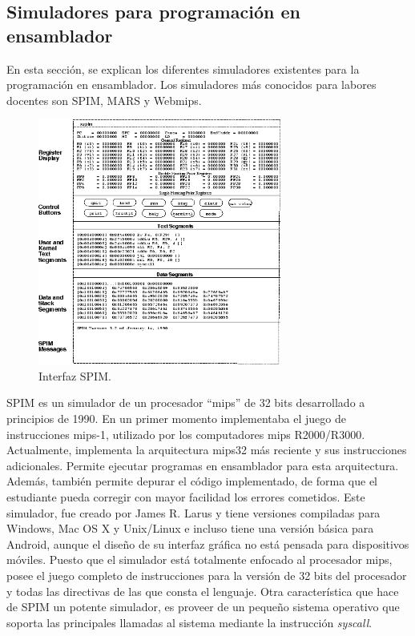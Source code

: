 \subsection{Simuladores para programación en \gls{ensamblador}}
\label{sec:simuladores_ensamblador}
En esta sección, se explican los diferentes simuladores existentes para la programación en \gls{ensamblador}. Los simuladores más conocidos para labores docentes son SPIM, MARS y Web\acrshort{mips}.

\begin{figure}[htbp]
 	\centering
 	\includegraphics[width=8cm]{figures/spim_figure}
 	\caption{Interfaz SPIM.}
	\label{fig:spim_figure}
\end{figure}

SPIM \cite{larus1990spim} es un simulador de un procesador ``\acrfull{mips}'' de 32 bits desarrollado a principios de 1990. En un primer momento implementaba el juego de instrucciones \acrshort{mips}-1, utilizado por los computadores \acrshort{mips} R2000/R3000. Actualmente, implementa la arquitectura \acrshort{mips}32 más reciente y sus instrucciones adicionales. Permite ejecutar programas en \gls{ensamblador} para esta arquitectura. Además, también permite depurar el código implementado, de forma que el estudiante pueda corregir con mayor facilidad los errores cometidos. Este simulador, fue creado por James R. Larus y tiene versiones compiladas para Windows, Mac OS X y Unix/Linux e incluso tiene una versión básica para Android, aunque el diseño de su interfaz gráfica no está pensada para dispositivos móviles. Puesto que el simulador está totalmente enfocado al procesador \acrshort{mips}, posee el juego completo de instrucciones para la versión de 32 bits del procesador y todas las directivas de las que consta el lenguaje. Otra característica que hace de SPIM un potente simulador, es proveer de un pequeño sistema operativo que soporta las principales llamadas al sistema mediante la instrucción \emph{syscall}. 

